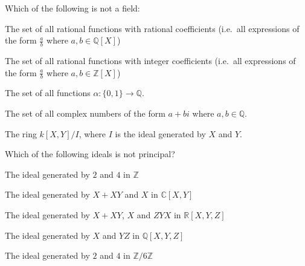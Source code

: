 \documentclass{article}
\newcommand{\QQ}{\mathbb Q}
\newcommand{\ZZ}{\mathbb Z}
\newcommand{\RR}{\mathbb R}
\newcommand{\CC}{\mathbb C}
\newcommand{\al}{\alpha}
\begin{document}

\begin{problem}

Which of the following is not a field:

\bad The set of all rational functions with rational coefficients (i.e.~all expressions of the form $\frac{a}{b}$ where $a,b\in \QQ[X]$)

\bad The set of all rational functions with integer coefficients (i.e.~all expressions of the form $\frac{a}{b}$ where $a,b\in \ZZ[X]$)

\good The set of all functions $\al\colon\{0,1\} \to \QQ$.

\bad The set of all complex numbers of the form $a +bi$ where $a,b\in \QQ$. 

\bad The ring $k[X,Y]/I$, where $I$ is the ideal generated by $X$ and $Y$.

\end{problem}


\begin{problem}

Which of the following ideals is not principal? 

\bad The ideal generated by $2$ and $4$ in $\ZZ$

\bad The ideal generated by $X+XY$ and $X$ in $\CC[X,Y]$

\bad The ideal generated by $X+XY$, $X$ and $ZYX$ in $\RR[X,Y,Z]$

\good The ideal generated by $X$ and $YZ$ in $\QQ[X,Y,Z]$

\bad The ideal generated by $2$ and $4$ in $\ZZ/6\ZZ$
\end{problem}
\end{document}
